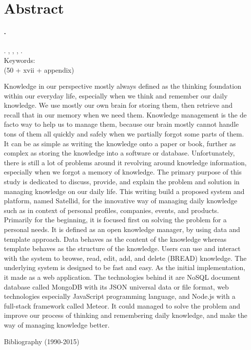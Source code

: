
\begingroup
\let\clearpage\relax
\let\cleardoublepage\relax

\label{chap:abstract}
\chapter{Abstract}

\textbf{\myName.} \myNPM \\
\textbf{\myTitle} \\
\textbf{\myThesisType}. \myDepartmentLong, \myFacultyLong, \myUni, \myYear. \\
Keywords: \myKeywords \\
(50 + xvii + appendix)

\hfill

\singlespacing

Knowledge in our perspective mostly always defined as the thinking foundation within our everyday life,
especially when we think and remember our daily knowledge.
We use mostly our own brain for storing them, then retrieve and recall that in our memory when we need them.
Knowledge management is the de facto way to help us to manage them, because our brain mostly cannot handle tons of them all quickly and safely when we partially forgot some parts of them.
It can be as simple as writing the knowledge onto a paper or book, further as complex as storing the knowledge into a software or database.
Unfortunately, there is still a lot of problems around it revolving around knowledge information, especially when we forgot a memory of knowledge.
The primary purpose of this study is dedicated to discuss, provide, and explain the problem and solution in managing knowledge on our daily life.
This writing build a proposed system and platform, named Satellid, for the innovative way of managing daily knowledge
such as in context of personal profiles, companies, events, and products.
Primarily for the beginning, it is focused first on solving the problem for a personal needs.
It is defined as an open knowledge manager, by using data and template approach.
Data behaves as the content of the knowledge whereas template behaves as the structure of the knowledge.
Users can use and interact with the system to browse, read, edit, add, and delete (BREAD) knowledge.
The underlying system is designed to be fast and easy.
As the initial implementation, it made as a web application.
The technologies behind it are NoSQL document database called MongoDB with its JSON universal data or file format, web technologies especially JavaScript programming language, and Node.js with a full-stack framework called Meteor.
It could managed to solve the problem and improve our process of thinking and remembering daily knowledge, and make the way of managing knowledge better.

\onehalfspacing

\hfill


\noindent Bibliography (1990-2015)



\endgroup

\vfill
